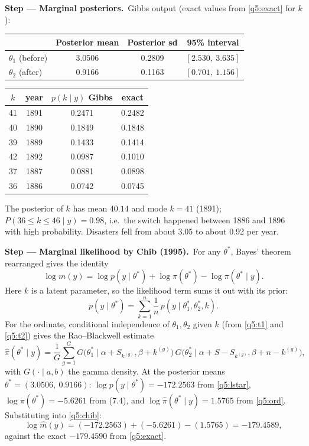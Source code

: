 \documentclass[11pt,a4paper]{article}
\numberwithin{equation}{questao}   %
\newcommand{\passo}[2]{\par\smallskip\noindent\textbf{Step --- #1.}~#2}
\begin{document}
\begin{sol}
\passo{Marginal posteriors}{Gibbs output (exact values from \eqref{q5:exact} for $k$):}
\begin{center}\small
\begin{tabular}{lccc}
\toprule
 & Posterior mean & Posterior sd & 95\% interval \\
\midrule
$\theta_1$ (before) & 3.0506 & 0.2809 & $[2.530,\ 3.635]$\\
$\theta_2$ (after)  & 0.9166 & 0.1163 & $[0.701,\ 1.156]$\\
\bottomrule
\end{tabular}
\qquad
\begin{tabular}{cccc}
\toprule
$k$ & year & $p(k\mid y)$ Gibbs & exact \\
\midrule
41 & 1891 & 0.2471 & 0.2482\\
40 & 1890 & 0.1849 & 0.1848\\
39 & 1889 & 0.1433 & 0.1414\\
42 & 1892 & 0.0987 & 0.1010\\
37 & 1887 & 0.0881 & 0.0898\\
36 & 1886 & 0.0742 & 0.0745\\
\bottomrule
\end{tabular}
\end{center}
The posterior of $k$ has mean $40.14$ and mode $k=41$ (1891); $P(36\le k\le46\mid y)=0.98$, i.e.\ the
switch happened between 1886 and 1896 with high probability. Disasters fell from about 3.05 to
about 0.92 per year.

\passo{Marginal likelihood by Chib (1995)}{For any $\theta^*$, Bayes' theorem rearranged gives the
identity}
\begin{equation}\label{q5:chib}
\log m(y)=\log p(y\mid\theta^*)+\log\pi(\theta^*)-\log\pi(\theta^*\mid y).
\end{equation}
Here $k$ is a latent parameter, so the likelihood term sums it out with its prior:
\begin{equation}\label{q5:lstar}
p(y\mid\theta^*)=\sum_{k=1}^n\frac1n\,p(y\mid\theta_1^*,\theta_2^*,k).
\end{equation}
For the ordinate, conditional independence of $\theta_1,\theta_2$ given $k$ (from \eqref{q5:t1} and
\eqref{q5:t2}) gives the Rao--Blackwell estimate
\begin{equation}\label{q5:ord}
\hat\pi(\theta^*\mid y)=\frac1G\sum_{g=1}^G G\big(\theta_1^*\mid\alpha+S_{k^{(g)}},\beta+k^{(g)}\big)\,
G\big(\theta_2^*\mid\alpha+S-S_{k^{(g)}},\beta+n-k^{(g)}\big),
\end{equation}
with $G(\cdot\mid a,b)$ the gamma density. At the posterior means $\theta^*=(3.0506,\ 0.9166)$:
$\log p(y\mid\theta^*)=-172.2563$ from \eqref{q5:lstar}, $\log\pi(\theta^*)=-5.6261$ from (7.4), and
$\log\hat\pi(\theta^*\mid y)=1.5765$ from \eqref{q5:ord}. Substituting into \eqref{q5:chib}:
\[
\log\hat m(y)=(-172.2563)+(-5.6261)-(1.5765)=-179.4589 ,
\]
against the exact $-179.4590$ from \eqref{q5:exact}.


\end{sol}
\end{document}
